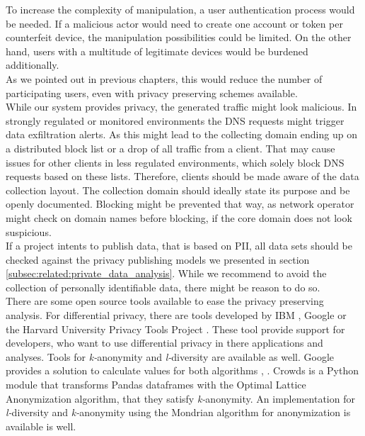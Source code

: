     To increase the complexity of manipulation, a user authentication process would be needed. If a malicious actor would need to create one account or token per counterfeit device, the manipulation possibilities could be limited. On the other hand, users with a multitude of legitimate devices would be burdened additionally.\\ 
    As we pointed out in previous chapters, this would reduce the number of participating users, even with privacy preserving schemes available.\\

    
    While our system provides privacy, the generated traffic might look malicious.
    In strongly regulated or monitored environments the DNS requests might trigger data exfiltration alerts. As this might lead to the collecting domain ending up on a distributed block list or a drop of all traffic from a client. That may cause issues for other clients in less regulated environments, which solely block DNS requests based on these lists.
    Therefore, clients should be made aware of the data collection layout. The collection domain should ideally state its purpose and be openly documented. Blocking might be prevented that way, as network operator might check on domain names before blocking, if the core domain does not look suspicious.\\

    If a project intents to publish data, that is based on PII, all data sets should be checked against the privacy publishing models we presented in section \ref{subsec:related:private_data_analysis}. While we recommend to avoid the collection of personally identifiable data, there might be reason to do so.\\
    There are some open source tools available to ease the privacy preserving analysis.
    For differential privacy, there are tools developed by IBM \cite{noauthor_ibmdifferential-privacy-library_2021}, Google \cite{noauthor_googledifferential-privacy_2021} or the Harvard University Privacy Tools Project \cite{salil_vadhan_opendp_nodate}. These tool provide support for developers, who want to use differential privacy in there applications and analyses.
    Tools for \textit{k-}anonymity and \textit{l-}diversity are available as well. 
    Google provides a solution to calculate values for both algorithms \cite{noauthor_computing_nodate}, \cite{noauthor_computing_nodate-1}. 
    Crowds \cite{mazzone_leo-mazzcrowds_2021} is a Python module that transforms Pandas dataframes with the Optimal Lattice Anonymization algorithm, that they satisfy \textit{k-}anonymity. An implementation for \textit{l-}diversity \cite{gong_qiyuangongmondrian_l_diversity_2021} and \textit{k-}anonymity \cite{gong_qiyuangongmondrian_2021} using the Mondrian algorithm for anonymization is available is well.

